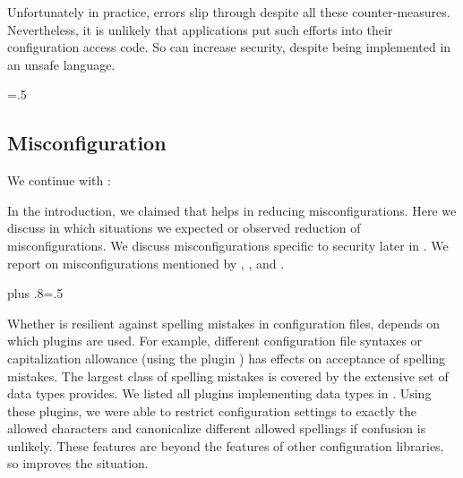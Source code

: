 \begin{code}[language=Cpp,firstnumber=19]
Unfortunately in practice, errors slip through despite all these counter-measures.
Nevertheless, it is unlikely that applications put such efforts into their configuration access code.
So \elektra{} can increase security, despite being implemented in an unsafe language.%
{\parfillskip=0pt \emergencystretch=.5\textwidth \par}




\subsection{Misconfiguration}
\label{sec:implication-misconfiguration}

We continue with :
\rqImplicationMisconfiguration*

In the introduction, we claimed that \elektra{} helps in reducing misconfigurations.
Here we discuss in which situations we expected or observed reduction of misconfigurations.
We discuss misconfigurations specific to security later in .
We report on misconfigurations mentioned by \citet{xu2015systems}, \citet{nagaraja2004understanding}, and \citet{keller2008conferr}.%
{\parfillskip=0pt plus .8\textwidth \emergencystretch=.5\textwidth \par}

Whether \elektra{} is resilient against spelling mistakes in configuration files, depends on which plugins are used.
For example, different configuration file syntaxes or capitalization allowance (using the plugin ) has effects on acceptance of spelling mistakes.
The largest class of spelling mistakes is covered by the extensive set of data types \elektra{} provides.
We listed all plugins implementing data types in .
Using these plugins, we were able to restrict configuration settings to exactly the allowed characters and canonicalize different allowed spellings if confusion is unlikely.
These features are beyond the features of other configuration libraries, so \elektra{} improves the situation.


\end{code}
